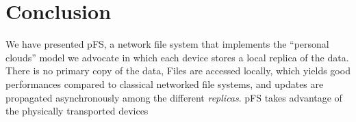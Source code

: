 
\section{Conclusion}
\label{sec:conc}

We have presented pFS, a network file system that implements the
``personal clouds'' model we advocate in which each device stores a
local replica of the data. There is no primary copy of the data,
Files are accessed locally, which yields good
performances compared to classical networked file systems, and updates
are propagated asynchronously among the different \emph{replicas}. pFS
takes advantage of the physically transported devices 

